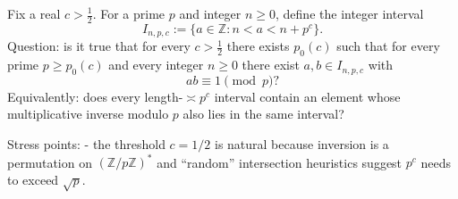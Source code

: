 Fix a real $c>\tfrac12$. For a prime $p$ and integer $n\ge 0$, define the integer interval
\[
I_{n,p,c}:=\{a\in\mathbb Z: n<a<n+p^c\}.
\]
Question: is it true that for every $c>\tfrac12$ there exists $p_0(c)$ such that for every prime $p\ge p_0(c)$ and every integer $n\ge 0$ there exist $a,b\in I_{n,p,c}$ with
\[
ab\equiv 1\pmod p?
\]
Equivalently: does every length-$\asymp p^c$ interval contain an element whose multiplicative inverse modulo $p$ also lies in the same interval?

Stress points:
- the threshold $c=1/2$ is natural because inversion is a permutation on $(\mathbb Z/p\mathbb Z)^*$ and ``random'' intersection heuristics suggest $p^c$ needs to exceed $\sqrt p$.
